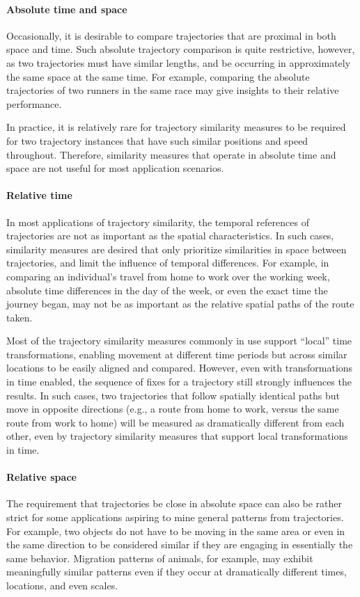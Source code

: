\documentclass[10pt,letterpaper]{article}
\begin{document}
\paragraph{Absolute time and space} 
Occasionally, it is desirable to compare trajectories that are proximal in both space and time.
Such absolute trajectory comparison is quite restrictive, however, as two trajectories must have  similar lengths, and be occurring in approximately the same space at the same time. For example, comparing the absolute trajectories of two runners in the same race may give insights to their relative performance. 

In practice, it is relatively rare for trajectory similarity measures to be required for two trajectory instances that have such similar positions and speed  throughout. Therefore, similarity measures that operate in absolute time and space are not useful for most application scenarios. 


\paragraph{Relative time}	
In most applications of trajectory similarity, the temporal references of trajectories are not as important as the spatial characteristics. In such cases, similarity measures are desired that only prioritize similarities in space between trajectories, and limit the influence of temporal differences. For example, in comparing an individual's travel from home to work over the working week, absolute time differences in the day of the week, or even the exact time the journey began, may not be as important as the relative spatial paths of the route taken. 

Most of the trajectory similarity measures commonly in use support ``local'' time transformations, enabling movement at different time periods but across similar locations to be easily aligned and compared. However, even with transformations in time enabled, the sequence of fixes for a trajectory still strongly influences the results. In such cases, two trajectories that follow spatially identical paths but move in opposite directions (e.g., a route from home to work, versus the same route from work to home) will be measured as dramatically different from each other, even by trajectory similarity measures that support local transformations in time.


\paragraph{Relative space}
The requirement that trajectories be close in absolute space can also be rather strict for some applications aspiring to mine general patterns from trajectories. For example, two objects do not have to be moving in the same area or even in the same direction to be considered similar if they are engaging in essentially the same behavior. Migration patterns of animals, for example, may exhibit meaningfully similar patterns even if they occur at dramatically different times, locations, and even scales. 
\end{document}
